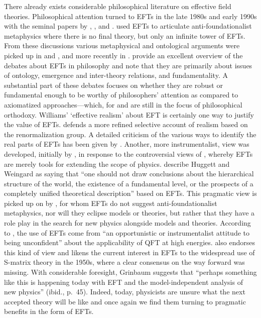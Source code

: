 There already exists considerable philosophical literature on effective field theories.
Philosophical attention turned to EFTs in the late 1980s and early 1990s with the seminal papers by \citet{teller89}, \citet{cao1993}, and \citet{huggetweingard}. 
\citet{cao1993} used EFTs to articulate anti-foundationalist metaphysics where there is no final theory, but only an infinite tower of EFTs. 
From these discussions various metaphysical and ontological arguments were picked up in \citet{castellani2002} and \citet{fraser2009}, and more recently in \citep{bain2013a,Crowther2016-CROESU,Rivat2020-RIVPFO,Ruetsche2018,williams2018}. 
\citet{Rivat2020-RIVPFO} provide an excellent overview of the debates about EFTs in philosophy and note that they are primarily about issues of ontology, emergence and inter-theory relations, and fundamentality. 
A substantial part of these debates focuses on whether they are robust or fundamental enough to be worthy of philosophers' attention as compared to axiomatized approaches---which, for \citet{wallace2006} and \citet{williams2018} are still in the focus of philosophical orthodoxy. 
Williams' `effective realism' about EFT is certainly one way to justify the value of EFTs. 
\citet{fraserj2020} defends a more refined selective account of realism based on  the renormalization group. 
A detailed criticism of the various ways to identify the real parts of EFTs has been given by \citep{rivat2020a}.
Another, more instrumentalist, view was developed, initially by \citet{huggetweingard}, in response to the controversial views of \citet{cao1993}, whereby EFTs are merely tools for extending the scope of physics. 
\citet{Rivat2020-RIVPFO} describe Huggett and Weingard as saying that 
``one should not draw conclusions about the hierarchical structure of the world, the existence of a fundamental level, or the prospects of a completely unified theoretical description'' based on EFTs.
This pragmatic view is picked up on by \citet{hartmann2001}, for whom EFTs do not suggest anti-foundationalist metaphysics, nor will they eclipse models or theories, but rather that they have a role play in the search for new physics alongside models and theories.
According to \citet{Butterfield_2010}, the use of EFTs come from ``an opportunistic or instrumentalist attitude to being unconfident'' about the applicability of QFT at high energies.
\citet{Grinbaum2008-GRIOTE} also endorses this kind of view and likens the current interest in EFTs to the widespread use of S-matrix theory in the 1950s, where a clear consensus on the way forward was missing. 
With considerable foresight, Grinbaum suggests that ``perhaps something like this is happening today with EFT and the model-independent analysis of new physics'' (ibid., p.~45).
Indeed, today, physicists are unsure what the next accepted theory will be like and once again we find them turning to pragmatic benefits in the form of EFTs.

